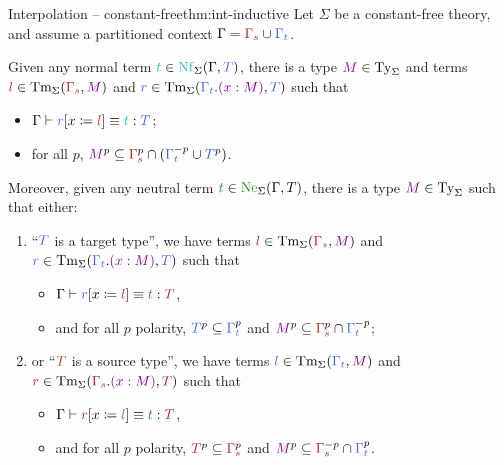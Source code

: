 \documentclass[10pt,a4paper]{notes-template}
\begin{document}
\begin{theorem}{Interpolation – constant-free}{thm:int-inductive}
  Let \(\Sigma\) be a constant-free theory, and assume
  a partitioned context \(\Gamma = \part{\Gamma_{s}}{\Gamma_{t}}\).
  
  Given any normal term
  \(\ccol{t} \in \Nf_{\Sigma}(\Gamma,\tcol{T})\),
  there is a type \(\mcol{M} \in \Ty_{\Sigma}\) and terms
  \(\scol{l} \in \Tm_{\Sigma}(\scol{\Gamma_{s}},\mcol{M})\) and
  \(\tcol{r} \in \Tm_{\Sigma}(\tcol{\Gamma_{t}}.\mcol{(x : M)}, \tcol{T})\)
  such that
  \begin{itemize}
    \item \(\conv{\Gamma}{\subs{\tcol{r}}{x}{\scol{l}}}{\ccol{t}}[\tcol{T}]\);
    \item for all \(p\),
    \(\mcol{M}^p \subseteq \scol{\Gamma_{s}}^p \cap (\tcol{\Gamma_{t}}^{-p} \cup \tcol{T}^p)\).
  \end{itemize}
  
  Moreover, given any neutral term
  \(\icol{t} \in \Ne_{\Sigma}(\Gamma,T)\), there is a type
  \(\mcol{M} \in \Ty_{\Sigma}\) such that either:
  \begin{enumerate}
    \item “\(\tcol{T}\) is a target type”, \ie
      we have terms \(\scol{l} \in \Tm_{\Sigma}(\scol{\Gamma_{s}},\mcol{M})\) and
      \(\tcol{r} \in \Tm_{\Sigma}(\tcol{\Gamma_{t}}.\mcol{(x : M)}, \tcol{T})\) such that
      \begin{itemize}
        \item \(\conv{\Gamma}{\subs{\tcol{r}}{x}{\scol{l}}}{\icol{t}}[\scol{T}]\),
        \item and for all \(p\) polarity, \(\tcol{T}^p \subseteq \tcol{\Gamma_{t}}^p\) and
          \(\mcol{M}^p \subseteq \scol{\Gamma_{s}}^p \cap \tcol{\Gamma_{t}}^{-p}\);
      \end{itemize}
    \item or “\(\scol{T}\) is a source type”, \ie
      we have terms \(\tcol{l} \in \Tm_{\Sigma}(\tcol{\Gamma_{t}},\mcol{M})\) and
  \(\scol{r} \in \Tm_{\Sigma}(\scol{\Gamma_{s}}.\mcol{(x : M)}, \scol{T})\) such that
      \begin{itemize}
        \item \(\conv{\Gamma}{\subs{\scol{r}}{x}{\tcol{l}}}{\icol{t}}[\scol{T}]\),
        \item and for all \(p\) polarity,
          \(\scol{T}^p \subseteq \scol{\Gamma_{s}}^p\) and
            \(\mcol{M}^p \subseteq \scol{\Gamma_{s}}^{-p} \cap \tcol{\Gamma_{t}}^p\).
      \end{itemize}
  \end{enumerate}
\end{theorem}
\end{document}

